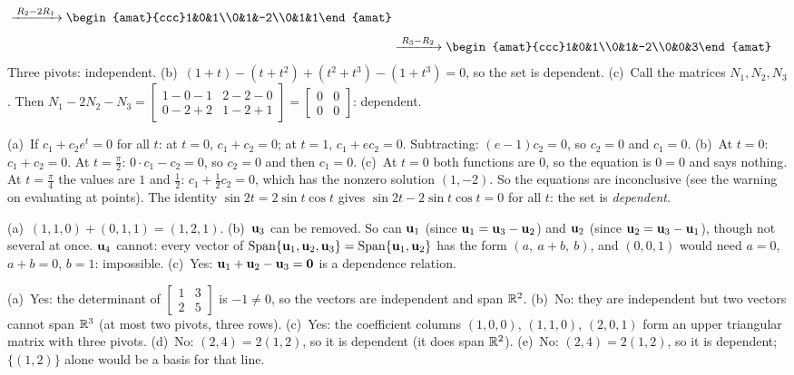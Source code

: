 \documentclass[11pt]{article}
\begin{document}
\begin{description}[leftmargin=0pt,itemsep=5pt]
\begin{align*}
\rops{R_2-2R_1}
\begin{amat}{ccc}1&0&1\\0&1&-2\\0&1&1\end{amat}
\\[4pt]
&\rops{R_3-R_2}
\begin{amat}{ccc}1&0&1\\0&1&-2\\0&0&3\end{amat}
\end{align*}
  Three pivots: independent. (b)~$(1+t)-(t+t^2)+(t^2+t^3)-(1+t^3)=0$, so the set is dependent. (c)~Call the matrices $N_1,N_2,N_3$. Then $N_1-2N_2-N_3=\begin{bmatrix}1-0-1&2-2-0\\0-2+2&1-2+1\end{bmatrix}=\begin{bmatrix}0&0\\0&0\end{bmatrix}$: dependent.
  \item[Knowledge Check \ref{kc:funcs}.] (a)~If $c_1+c_2e^t=0$ for all $t$: at $t=0$, $c_1+c_2=0$; at $t=1$, $c_1+ec_2=0$. Subtracting: $(e-1)c_2=0$, so $c_2=0$ and $c_1=0$. (b)~At $t=0$: $c_1+c_2=0$. At $t=\tfrac{\pi}{2}$: $0\cdot c_1-c_2=0$, so $c_2=0$ and then $c_1=0$. (c)~At $t=0$ both functions are $0$, so the equation is $0=0$ and says nothing. At $t=\tfrac{\pi}{4}$ the values are $1$ and $\tfrac12$: $c_1+\tfrac12c_2=0$, which has the nonzero solution $(1,-2)$. So the equations are inconclusive (see the warning on evaluating at points). The identity $\sin2t=2\sin t\cos t$ gives $\sin2t-2\sin t\cos t=0$ for all $t$: the set is \emph{dependent}.
  \item[Knowledge Check \ref{kc:removable}.] (a)~$(1,1,0)+(0,1,1)=(1,2,1)$. (b)~$\mathbf{u}_3$ can be removed. So can $\mathbf{u}_1$ (since $\mathbf{u}_1=\mathbf{u}_3-\mathbf{u}_2$) and $\mathbf{u}_2$ (since $\mathbf{u}_2=\mathbf{u}_3-\mathbf{u}_1$), though not several at once. $\mathbf{u}_4$ cannot: every vector of $\operatorname{Span}\{\mathbf{u}_1,\mathbf{u}_2,\mathbf{u}_3\}=\operatorname{Span}\{\mathbf{u}_1,\mathbf{u}_2\}$ has the form $(a,\ a+b,\ b)$, and $(0,0,1)$ would need $a=0$, $a+b=0$, $b=1$: impossible. (c)~Yes: $\mathbf{u}_1+\mathbf{u}_2-\mathbf{u}_3=\mathbf{0}$ is a dependence relation.
  \item[Knowledge Check \ref{kc:isbasis}.] (a)~Yes: the determinant of $\begin{bmatrix}1&3\\2&5\end{bmatrix}$ is $-1\neq0$, so the vectors are independent and span $\mathbb{R}^2$. (b)~No: they are independent but two vectors cannot span $\mathbb{R}^3$ (at most two pivots, three rows). (c)~Yes: the coefficient columns $(1,0,0)$, $(1,1,0)$, $(2,0,1)$ form an upper triangular matrix with three pivots. (d)~No: $(2,4)=2(1,2)$, so it is dependent (it does span $\mathbb{R}^2$). (e)~No: $(2,4)=2(1,2)$, so it is dependent; $\{(1,2)\}$ alone would be a basis for that line.

\end{description}
\end{document}
